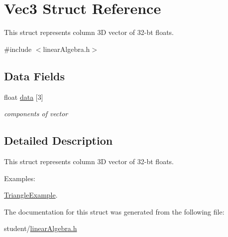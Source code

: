 \hypertarget{structVec3}{}\section{Vec3 Struct Reference}
\label{structVec3}


This struct represents column 3D vector of 32-\/bt floats.  




{\ttfamily \#include $<$linear\+Algebra.\+h$>$}

\subsection*{Data Fields}
\begin{DoxyCompactItemize}
\item 
float \hyperlink{structVec3_ab4091bcbf544cb1ae91ba8855ddaaa0b}{data} \mbox{[}3\mbox{]}\hypertarget{structVec3_ab4091bcbf544cb1ae91ba8855ddaaa0b}{}\label{structVec3_ab4091bcbf544cb1ae91ba8855ddaaa0b}

\begin{DoxyCompactList}\small\item\em components of vector \end{DoxyCompactList}\end{DoxyCompactItemize}


\subsection{Detailed Description}
This struct represents column 3D vector of 32-\/bt floats. \begin{Desc}
\item[Examples\+: ]\par
\hyperlink{TriangleExample-example}{Triangle\+Example}.\end{Desc}


The documentation for this struct was generated from the following file\+:\begin{DoxyCompactItemize}
\item 
student/\hyperlink{linearAlgebra_8h}{linear\+Algebra.\+h}\end{DoxyCompactItemize}
